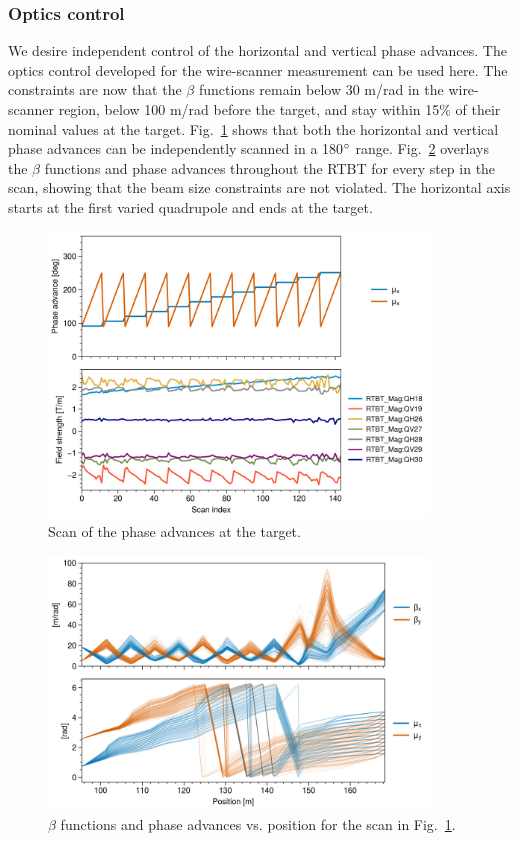 \subsubsection{Optics control}

We desire independent control of the horizontal and vertical phase advances. The optics control developed for the wire-scanner measurement can be used here. The constraints are now that the $\beta$ functions remain below 30 m/rad in the wire-scanner region, below 100 m/rad before the target, and stay within 15\% of their nominal values at the target. Fig.~\ref{fig:target_phase_scan_1} shows that both the horizontal and vertical phase advances can be independently scanned in a 180$\degree$ range. Fig.~\ref{fig:target_phase_scan_2} overlays the $\beta$ functions and phase advances throughout the RTBT for every step in the scan, showing that the beam size constraints are not violated. The horizontal axis starts at the first varied quadrupole and ends at the target.
%
\begin{figure}[!p]
    \centering
    \vspace*{2.0cm}
    \includegraphics[width=0.9\textwidth]{Images/chapter4/target_phase_scan1.png}
    \caption{Scan of the phase advances at the target.}
     \label{fig:target_phase_scan_1}
    \vspace*{2.0cm}
\end{figure}
%
\begin{figure}[!p]
    \centering
    \includegraphics[width=0.9\textwidth]{Images/chapter4/target_phase_scan2.png}
    \caption{$\beta$ functions and phase advances vs. position for the scan in Fig.~\ref{fig:target_phase_scan_1}.}
    \label{fig:target_phase_scan_2}
\end{figure}
